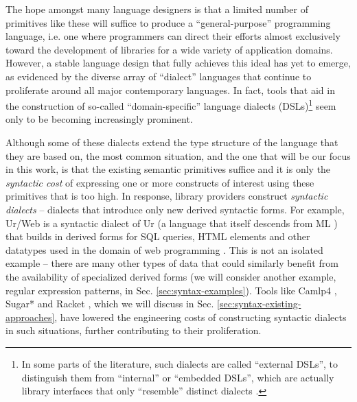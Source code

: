 The hope amongst many language designers is that a limited number of primitives like these will suffice to produce a ``general-purpose'' programming language, i.e. one where programmers can direct their efforts almost exclusively toward the development of libraries for a wide variety of application domains. However, a stable language design that fully achieves this ideal has yet to emerge, as evidenced by the diverse array of ``dialect'' languages that continue to proliferate around all major contemporary languages. 
In fact, tools that aid in the construction of so-called  ``domain-specific'' language dialects (DSLs)\footnote{In some parts of the literature, such dialects are called ``external DSLs'', to distinguish them from  ``internal'' or ``embedded DSLs'', which are actually  library interfaces that only ``resemble'' distinct dialects \cite{fowler2010domain}.} seem only to be becoming increasingly prominent. 

Although some of these dialects extend the type structure of the language that they are based on, the most common situation, and the one that will be our focus in this work, is that the existing semantic primitives suffice and it is only the \emph{syntactic cost} of expressing one or more constructs of interest using these primitives  that is too high. In response, library providers construct \emph{syntactic dialects} -- dialects that introduce only new derived syntactic forms. 
For example, Ur/Web is a syntactic dialect of Ur (a language that itself descends from ML \cite{conf/pldi/Chlipala10}) that builds in derived forms for SQL queries, HTML elements and other datatypes used in the domain of web programming \cite{conf/popl/Chlipala15}. %
This is not an isolated example -- there are many other types of data that could similarly benefit from the availability of specialized derived forms (we will consider another example, regular expression patterns, in Sec. \ref{sec:syntax-examples}). 
Tools like Camlp4 \cite{ocaml-manual}, Sugar* \cite{erdweg2011sugarj,erdweg2013framework} and Racket \cite{Flatt:2012:CLR:2063176.2063195}, which we will discuss in Sec. \ref{sec:syntax-existing-approaches}, have lowered the engineering costs of constructing syntactic dialects in such situations, further contributing to their proliferation. 

